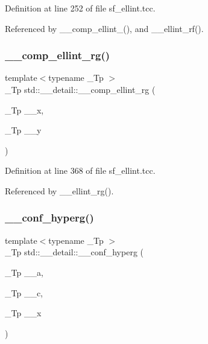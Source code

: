 Definition at line 252 of file sf\+\_\+ellint.\+tcc.



Referenced by \+\_\+\+\_\+comp\+\_\+ellint\+\_(), and \+\_\+\+\_\+ellint\+\_\+rf().

\mbox{\label{namespacestd_1_1____detail_a31bb5a6e359c88b5bece8dd73f76a2f9}} 
\subsubsection{\texorpdfstring{\+\_\+\+\_\+comp\+\_\+ellint\+\_\+rg()}{\_\_comp\_ellint\_rg()}}
{\footnotesize\ttfamily template$<$typename \+\_\+\+Tp $>$ \\
\+\_\+\+Tp std\+::\+\_\+\+\_\+detail\+::\+\_\+\+\_\+comp\+\_\+ellint\+\_\+rg (\begin{DoxyParamCaption}\item[{\+\_\+\+Tp}]{\+\_\+\+\_\+x,  }\item[{\+\_\+\+Tp}]{\+\_\+\+\_\+y }\end{DoxyParamCaption})}



Definition at line 368 of file sf\+\_\+ellint.\+tcc.



Referenced by \+\_\+\+\_\+ellint\+\_\+rg().

\mbox{\label{namespacestd_1_1____detail_a3cb3151857e9ac01bc442c90301365ee}} 
\subsubsection{\texorpdfstring{\+\_\+\+\_\+conf\+\_\+hyperg()}{\_\_conf\_hyperg()}}
{\footnotesize\ttfamily template$<$typename \+\_\+\+Tp $>$ \\
\+\_\+\+Tp std\+::\+\_\+\+\_\+detail\+::\+\_\+\+\_\+conf\+\_\+hyperg (\begin{DoxyParamCaption}\item[{\+\_\+\+Tp}]{\+\_\+\+\_\+a,  }\item[{\+\_\+\+Tp}]{\+\_\+\+\_\+c,  }\item[{\+\_\+\+Tp}]{\+\_\+\+\_\+x }\end{DoxyParamCaption})}



